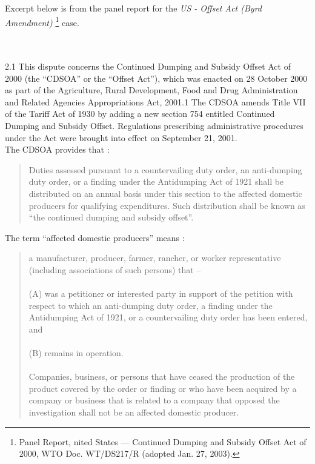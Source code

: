 Excerpt below is from the panel report for the 
\textit{US - Offset Act (Byrd Amendment)}
\footnote{Panel Report, nited States — Continued Dumping and Subsidy Offset Act of 2000, WTO Doc. WT/DS217/R (adopted Jan. 27, 2003).} case.\\

\begin{tcolorbox}[breakable]
\\\\
2.1 \quad This dispute concerns the Continued Dumping and Subsidy Offset Act of 2000 (the
“CDSOA” or the “Offset Act”), which was enacted on 28 October 2000 as part of the Agriculture,
Rural Development, Food and Drug Administration and Related Agencies Appropriations Act, 2001.1
The CDSOA amends Title VII of the Tariff Act of 1930 by adding a new section 754 entitled
Continued Dumping and Subsidy Offset. Regulations prescribing administrative procedures under the
Act were brought into effect on September 21, 2001.\\

 \quad The CDSOA provides that :

\blockquote{
    Duties assessed pursuant to a countervailing duty order, an anti-dumping duty order,
    or a finding under the Antidumping Act of 1921 shall be distributed on an annual
    basis under this section to the affected domestic producers for qualifying
    expenditures. Such distribution shall be known as “the continued dumping and
    subsidy offset”.
    }

 \quad The term “affected domestic producers” means :

\blockquote{
    a manufacturer, producer, farmer, rancher, or worker representative (including
associations of such persons) that – \\\\
        (A) was a petitioner or interested party in support of the petition with respect
to which an anti-dumping duty order, a finding under the Antidumping Act of 1921,
or a countervailing duty order has been entered, and \\\\
\quad \quad (B) remains in operation. \\\\
Companies, business, or persons that have ceased the production of the product
covered by the order or finding or who have been acquired by a company or business
that is related to a company that opposed the investigation shall not be an affected
domestic producer.
}


\end{tcolorbox}
